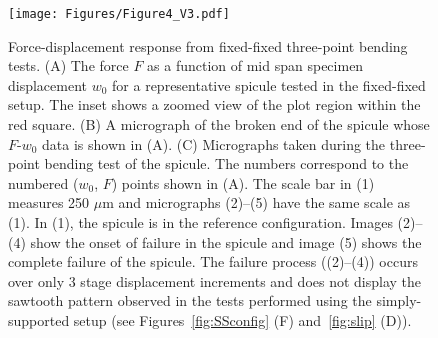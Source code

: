 \begin{figure}[ht!]
\centering
\texttt{[image: Figures/Figure4\_V3.pdf]}
\caption{Force-displacement response from fixed-fixed three-point bending tests. (\textsf{A}) The force $F$ as a function of mid span specimen displacement $w_0$ for a representative spicule tested in the fixed-fixed setup. The inset shows a zoomed view of the plot region within the red square. (\textsf{B}) A micrograph of the broken end of the spicule whose $F$-$w_0 $ data is shown in (\textsf{A}). (\textsf{C}) Micrographs taken during the three-point bending test of the spicule. The numbers correspond to the numbered ($w_0$, $F$) points shown in (\textsf{A}). The scale bar in (1) measures 250 $\mu$m and micrographs (2)--(5) have the same scale as (1). In (1), the spicule is in the reference configuration. Images (2)--(4) show the onset of failure in the spicule and image (5) shows the complete failure of the spicule. The failure process ((2)--(4)) occurs over only 3 stage displacement increments and does not display the sawtooth pattern observed in the tests performed using the simply-supported setup (see Figures~\ref{fig:SSconfig} (\textsf{F}) and~\ref{fig:slip} (\textsf{D})).}
\label{fig:TPBF}
\end{figure}
